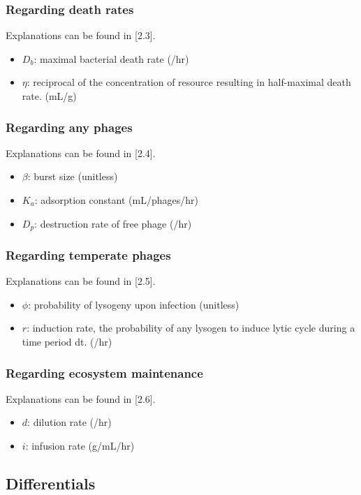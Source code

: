 \documentclass{article}
\begin{document}
\subsubsection{Regarding death rates} 
Explanations can be found in [2.3].
\begin{itemize}
\item $D_b$: maximal bacterial death rate (/hr)

\item $\eta$: reciprocal of the concentration of resource resulting in half-maximal death rate. (mL/g)
\end{itemize}

\subsubsection{Regarding any phages} 
Explanations can be found in [2.4].
\begin{itemize}
\item $\beta$: burst size (unitless)
\item $K_a$: adsorption constant (mL/phages/hr)
\item $D_p$: destruction rate of free phage (/hr)
\end{itemize}

\subsubsection{Regarding temperate phages} 
Explanations can be found in [2.5].

\begin{itemize}
\item $\phi$: probability of lysogeny upon infection (unitless)

\item $r$: induction rate, the probability of any lysogen to induce lytic cycle during a time period dt. (/hr)
\end{itemize}
\subsubsection{Regarding ecosystem maintenance} 
Explanations can be found in [2.6].
\begin{itemize}
\item $d$: dilution rate (/hr)

\item $i$: infusion rate (g/mL/hr)
\end{itemize}


\subsection{Differentials}
\end{document}
